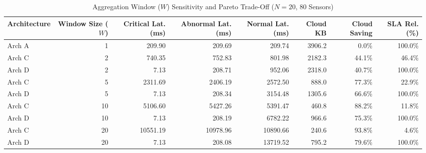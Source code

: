 \begin{table}[t]
\centering
\caption{Aggregation Window ($W$) Sensitivity and Pareto Trade-Off ($N=20$, $80$ Sensors)}
\label{tab:window_sensitivity}
\begin{tabular}{lrrrrrrr}
\toprule
\textbf{Architecture} & \textbf{Window Size ($W$)} & \textbf{Critical Lat. (ms)} & \textbf{Abnormal Lat. (ms)} & \textbf{Normal Lat. (ms)} & \textbf{Cloud KB} & \textbf{Cloud Saving} & \textbf{SLA Rel. (\%)} \\
\midrule
Arch A & 1 & 209.90 & 209.69 & 209.74 & 3906.2 & 0.0\% & 100.0\% \\
Arch C & 2 & 740.35 & 752.83 & 801.98 & 2182.3 & 44.1\% & 46.4\% \\
Arch D & 2 & 7.13 & 208.71 & 952.06 & 2318.0 & 40.7\% & 100.0\% \\
Arch C & 5 & 2311.69 & 2406.19 & 2572.50 & 888.0 & 77.3\% & 22.9\% \\
Arch D & 5 & 7.13 & 208.34 & 3154.48 & 1305.6 & 66.6\% & 100.0\% \\
Arch C & 10 & 5106.60 & 5427.26 & 5391.47 & 460.8 & 88.2\% & 11.8\% \\
Arch D & 10 & 7.13 & 208.19 & 6782.22 & 966.6 & 75.3\% & 100.0\% \\
Arch C & 20 & 10551.19 & 10978.96 & 10890.66 & 240.6 & 93.8\% & 4.6\% \\
Arch D & 20 & 7.13 & 208.08 & 13719.52 & 795.2 & 79.6\% & 100.0\% \\
\bottomrule
\end{tabular}
\end{table}


